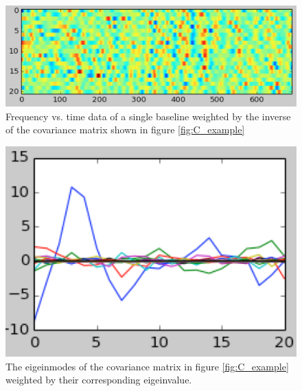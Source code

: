 \documentclass[twocolumn,numberedappendix]{emulateapj}
\begin{document}
\begin{figure}[h!]\centering
\includegraphics[width=\columnwidth, height=.8\columnwidth]{plots/_Cx_example.png}
\caption{Frequency vs. time data of a single baseline weighted by the inverse of
the covariance matrix shown in figure \ref{fig:C_example}} 
\label{fig:_Cx_example}
\end{figure}

\begin{figure}[h!]\centering
\includegraphics[width=\columnwidth, height=.8\columnwidth]{plots/lamV_example.png}
\caption{The eigeinmodes of the covariance matrix in figure \ref{fig:C_example}
weighted by their corresponding eigeinvalue.} 
\label{fig:lamV_example}
\end{figure}
\end{document}
